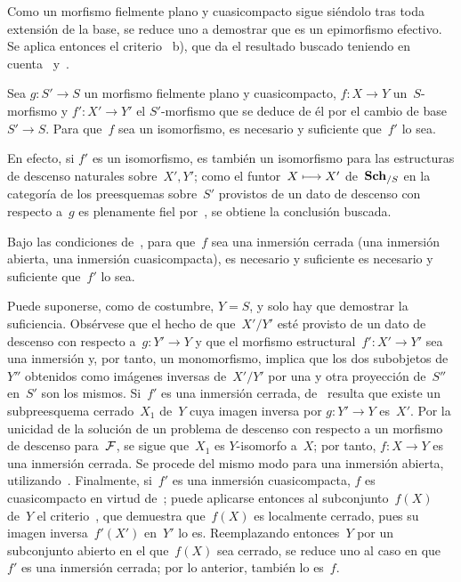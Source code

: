 Como un morfismo fielmente plano y cuasicompacto sigue siéndolo tras toda
extensión de la base, se reduce uno a demostrar que es un epimorfismo
efectivo. Se aplica entonces el criterio~ b), que da el
resultado buscado teniendo en cuenta~ y~.

\begin{corollaire}
\label{VIII.5.4}
Sea $g\colon S'\to S$ un morfismo fielmente plano y cuasicompacto,
$f\colon X\to Y$ un~$S$-morfismo y $f'\colon X'\to Y'$ el
$S'$-morfismo que se deduce de él por el cambio de base~$S'\to S$. Para
que~$f$ sea un isomorfismo, es necesario y suficiente que~$f'$ lo sea.
\end{corollaire}

En efecto, si $f'$ es un isomorfismo, es también un isomorfismo para las
estructuras de descenso naturales sobre~$X',Y'$; como el
funtor~$X\mto X'$ de~$\Sch_{/S}$ en la categoría de los preesquemas
sobre~$S'$ provistos de un dato de descenso con respecto a~$g$ es plenamente
fiel por~, se obtiene la conclusión buscada.

\begin{corollaire}
\label{VIII.5.5}
Bajo las condiciones de~, para que~$f$ sea una inmersión
cerrada (\resp una inmersión abierta, \resp una inmersión cuasicompacta),
{es necesario y suficiente}
{es necesario y suficiente}
que~$f'$ lo sea.
\end{corollaire}

Puede suponerse, como de costumbre, $Y=S$, y solo hay que demostrar la
suficiencia. Obsérvese que el hecho de que~$X'/Y'$ esté provisto de un dato
de descenso con respecto a~$g\colon Y'\to Y$ y que el morfismo
estructural~$f'\colon X'\to Y'$ sea una inmersión y, por tanto, un
monomorfismo, implica que los dos subobjetos de~$Y''$ obtenidos como
imágenes
inversas de~$X'/Y'$ por una y otra proyección de~$S''$ en~$S'$ son los
mismos. Si~$f'$ es una inmersión cerrada, de~ resulta que
existe un subpreesquema cerrado~$X_{1}$ de~$Y$ cuya imagen inversa por
$g\colon Y'\to Y$ es~$X'$. Por la unicidad de la solución de un problema
de descenso con respecto a un morfismo de descenso para~$\cal{F}$,
{}
{se}
sigue que~$X_{1}$ es $Y$-isomorfo a~$X$; por tanto,
$f\colon X\to Y$ es una inmersión cerrada. Se procede del mismo modo para
una inmersión abierta, utilizando~. Finalmente, si~$f'$ es
una inmersión cuasicompacta, $f$ es cuasicompacto en virtud
de~; puede aplicarse entonces al subconjunto~$f(X)$ de~$Y$
el criterio~, que demuestra que~$f(X)$ es localmente cerrado,
pues su imagen inversa~$f'(X')$ en~$Y'$ lo es. Reemplazando entonces~$Y$
por un subconjunto abierto en el que~$f(X)$ sea cerrado, se reduce uno al
caso en que~$f'$ es una inmersión cerrada; por lo anterior, también lo
es~$f$.

